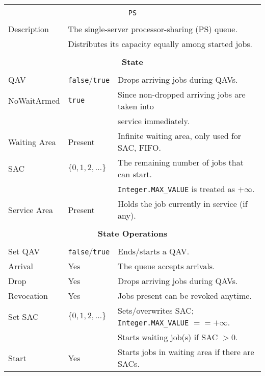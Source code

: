 \documentclass[12pt]{book}
\begin{document}
\begin{tabular}{|l|l|l|}
\hline
\multicolumn{3}{|c|}{} \\
\multicolumn{3}{|c|}{\lstinline[basicstyle=\large]{PS}} \\
\multicolumn{3}{|c|}{} \\
\hline
Description & \multicolumn{2}{|l}{The single-server processor-sharing (PS) queue.} \\
            & \multicolumn{2}{l|}{Distributes its capacity equally among started jobs.} \\
\hline
\multicolumn{3}{|c|}{} \\
\multicolumn{3}{|c|}{\bf State} \\
\multicolumn{3}{|c|}{} \\
\hline
QAV & \lstinline|false|/\lstinline|true| & Drops arriving jobs during QAVs. \\
\hline
NoWaitArmed & \lstinline|true| & Since non-dropped arriving jobs are taken into \\
            &                  & service immediately. \\
\hline
Waiting Area & Present & Infinite waiting area, only used for SAC, FIFO. \\
\hline
SAC & $\{0, 1, 2, \ldots\}$ & The remaining number of jobs that can start. \\
    &                       & \lstinline|Integer.MAX_VALUE| is treated as $+\infty$. \\
\hline
Service Area & Present & Holds the job currently in service (if any). \\
\hline
\multicolumn{3}{|c|}{} \\
\multicolumn{3}{|c|}{\bf State Operations} \\
\multicolumn{3}{|c|}{} \\
\hline
Set QAV & \lstinline|false|/\lstinline|true| & Ends/starts a QAV. \\
\hline
Arrival & Yes & The queue accepts arrivals. \\
\hline
Drop & Yes & Drops arriving jobs during QAVs. \\
\hline
Revocation & Yes & Jobs present can be revoked anytime. \\
\hline
Set SAC & $\{0, 1, 2, \ldots\}$ & Sets/overwrites SAC; \lstinline|Integer.MAX_VALUE| $== +\infty$. \\
        &                       & Starts waiting job(s) if SAC $> 0$. \\
\hline
Start & Yes & Starts jobs in waiting area if there are SACs. \\

\end{tabular}
\end{document}
